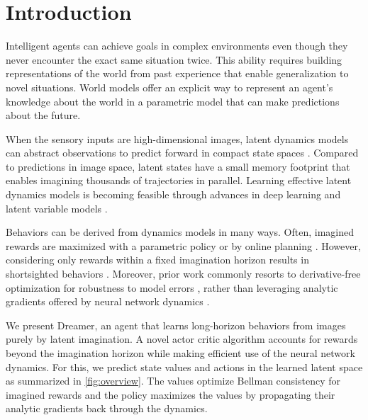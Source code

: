 \suppressfloats

\section{Introduction}
\label{sec:intro}

\begingroup
\setlength\intextsep{0pt}


Intelligent agents can achieve goals in complex environments even though they never encounter the exact same situation twice. This ability requires building representations of the world from past experience that enable generalization to novel situations. World models offer an explicit way to represent an agent’s knowledge about the world in a parametric model that can make predictions about the future.

When the sensory inputs are high-dimensional images, latent dynamics models can abstract observations to predict forward in compact state spaces \citep{watter2015e2c,oh2017vpn,gregor2019beliefstate}. Compared to predictions in image space, latent states have a small memory footprint that enables imagining thousands of trajectories in parallel. Learning effective latent dynamics models is becoming feasible through advances in deep learning and latent variable models \citep{krishnan2015deepkalman,karl2016dvbf,doerr2018prssm,buesing2018dssm}.

Behaviors can be derived from dynamics models in many ways. Often, imagined rewards are maximized with a parametric policy \citep{sutton1991dyna,ha2018worldmodels,zhang2018solar} or by online planning \citep{chua2018pets,hafner2018planet}. However, considering only rewards within a fixed imagination horizon results in shortsighted behaviors \citep{tingwu2019benchmark}. Moreover, prior work commonly resorts to derivative-free optimization for robustness to model errors \citep{ebert2017visualmpc,chua2018pets,parmas2019pipps}, rather than leveraging analytic gradients offered by neural network dynamics \citep{henaff2019planbybackprop,srinivas2018upn}.

We present Dreamer, an agent that learns long-horizon behaviors from images purely by latent imagination. A novel actor critic algorithm accounts for rewards beyond the imagination horizon while making efficient use of the neural network dynamics. For this, we predict state values and actions in the learned latent space as summarized in \cref{fig:overview}. The values optimize Bellman consistency for imagined rewards and the policy maximizes the values by propagating their analytic gradients back through the dynamics.

